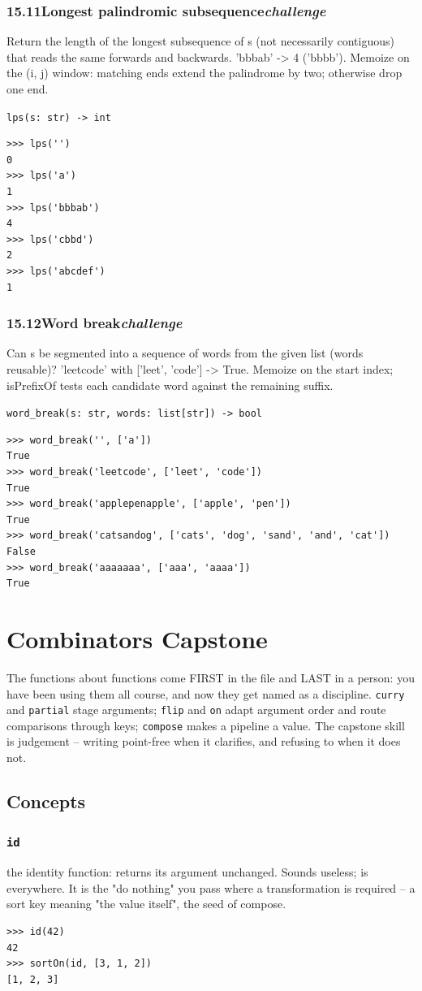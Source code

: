 \documentclass[10pt,letterpaper]{book}
\begin{document}
\subsection*{15.11\quad Longest palindromic subsequence\hfill\textnormal{\textit{challenge}}}
Return the length of the longest subsequence of s (not necessarily contiguous) that reads the same forwards and backwards. 'bbbab' -> 4 ('bbbb'). Memoize on the (i, j) window: matching ends extend the palindrome by two; otherwise drop one end.

\noindent\texttt{lps(s: str) -> int}
\begin{lstlisting}[style=ex]
>>> lps('')
0
>>> lps('a')
1
>>> lps('bbbab')
4
>>> lps('cbbd')
2
>>> lps('abcdef')
1
\end{lstlisting}
\subsection*{15.12\quad Word break\hfill\textnormal{\textit{challenge}}}
Can s be segmented into a sequence of words from the given list (words reusable)? 'leetcode' with ['leet', 'code'] -> True. Memoize on the start index; isPrefixOf tests each candidate word against the remaining suffix.

\noindent\texttt{word\_break(s: str, words: list[str]) -> bool}
\begin{lstlisting}[style=ex]
>>> word_break('', ['a'])
True
>>> word_break('leetcode', ['leet', 'code'])
True
>>> word_break('applepenapple', ['apple', 'pen'])
True
>>> word_break('catsandog', ['cats', 'dog', 'sand', 'and', 'cat'])
False
>>> word_break('aaaaaaa', ['aaa', 'aaaa'])
True
\end{lstlisting}
\clearpage
\chapter{Combinators Capstone}

The functions about functions come FIRST in the file and LAST in a person:
you have been using them all course, and now they get named as a
discipline. \texttt{curry} and \texttt{partial} stage arguments;
\texttt{flip} and \texttt{on} adapt argument order and route comparisons
through keys; \texttt{compose} makes a pipeline a value. The capstone skill
is judgement -- writing point-free when it clarifies, and refusing to when
it does not.
\section{Concepts}
\subsection{\texttt{id}}\label{def:id}
the identity function: returns its argument unchanged. Sounds useless; is everywhere. It is the "do nothing" you pass where a transformation is required -- a sort key meaning "the value itself", the seed of compose.
\begin{lstlisting}[style=ex]
>>> id(42)
42
>>> sortOn(id, [3, 1, 2])
[1, 2, 3]
\end{lstlisting}
\end{document}
